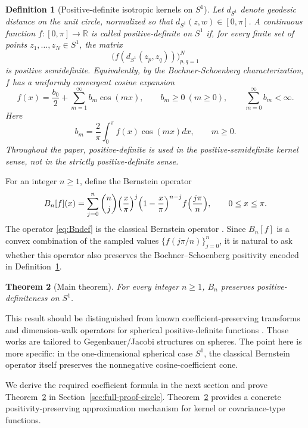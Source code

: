 \documentclass[10pt,a4paper]{amsart}
\newtheorem{theorem}{Theorem}[section]
\newtheorem{definition}[theorem]{Definition}
\begin{document}
\begin{definition}[Positive-definite isotropic kernels on $S^1$] 
\label{def:pd-circle}
Let $d_{S^1}$ denote geodesic distance on the unit circle, normalized so that $d_{S^1}(z,w)\in[0,\pi]$. A continuous function $f: [0,\pi] \to\mathbb R$ is called positive-definite on $S^1$ if, for every finite set of points $z_1,\ldots,z_N \in S^1$, the matrix 
\[ \bigl(f(d_{S^1}(z_p,z_q))\bigr)_{p,q=1}^N \] 
is positive semidefinite. Equivalently, by the Bochner-Schoenberg characterization, $f$ has a uniformly convergent cosine expansion 
\[ 
f(x) = 
\frac{b_0}{2} + \sum_{m=1}^{\infty} b_m\cos(mx), \qquad b_m\ge0 \ (m \geq 0), \qquad \sum_{m=0}^{\infty} b_m<\infty. 
\] 
Here 
\[ 
b_m=\frac{2}{\pi}\int_0^\pi f(x)\cos(mx) dx,\qquad m \ge 0. 
\] 
Throughout the paper, positive-definite is used in the positive-semidefinite kernel sense, not in the strictly positive-definite sense. 
\end{definition}


For an integer $n\ge 1$, define the Bernstein operator
\begin{equation}
\label{eq:Bndef}
B_n[f](x)=\sum_{j=0}^{n}\binom{n}{j}
\Bigl(\frac{x}{\pi}\Bigr)^j\Bigl(1-\frac{x}{\pi}\Bigr)^{n-j}
f\Bigl(\frac{j\pi}{n}\Bigr), \qquad 0 \le x\le \pi.
\end{equation}
The operator \eqref{eq:Bndef} is the classical Bernstein operator \cite{Lorentz1953Bernstein}. Since $B_n[f]$ is a convex combination of the sampled values $\{f(j\pi/n)\}_{j=0}^n$, it is natural to ask whether this operator also preserves the Bochner--Schoenberg positivity encoded in Definition~\ref{def:pd-circle}. 




\begin{theorem}[Main theorem]\label{thm:main}
For every integer $n\ge 1$, $B_n$ preserves positive-definiteness on $S^1$.
\end{theorem}


This result should be distinguished from known coefficient-preserving transforms and dimension-walk operators for spherical positive-definite functions \cite{BeatsonZuCastell2016,BeatsonZuCastell2017,Xu2017Jacobi,MassaPeronPorcu2017}. Those works are tailored to Gegenbauer/Jacobi structures on spheres. The point here is more specific: in the one-dimensional spherical case $S^1$, the classical Bernstein operator itself preserves the nonnegative cosine-coefficient cone.



We derive the required coefficient formula in the next section and prove Theorem~\ref{thm:main} in Section~\ref{sec:full-proof-circle}. Theorem~\ref{thm:main} provides a concrete positivity-preserving approximation mechanism for kernel or covariance-type functions.
\end{document}
